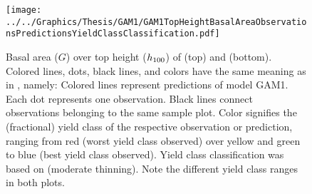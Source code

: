 \begin{figure}[h]
  \centering
  \texttt{[image: ../../Graphics/Thesis/GAM1/GAM1TopHeightBasalAreaObservationsPredictionsYieldClassClassification.pdf]}
  \caption{Basal area (\(G\)) over top height (\(h_{100}{}\)) of \Beech{} (top) and \Spruce{} (bottom).  Colored lines, dots, black lines, and colors have the same meaning as in , namely:  Colored lines represent predictions of model GAM1.  Each dot represents one observation.  Black lines connect observations belonging to the same sample plot.  Color signifies the (fractional) yield class of the respective observation or prediction, ranging from red (worst yield class observed) over yellow and green to blue (best yield class observed). Yield class classification was based on \textcite{Schober1995} (moderate thinning).  Note the different yield class ranges in both plots.}
  \label{fig:GAM1TopHeightBasalAreaObservationsPredictionsYieldClassClassification}
\end{figure}

\clearpage{}

